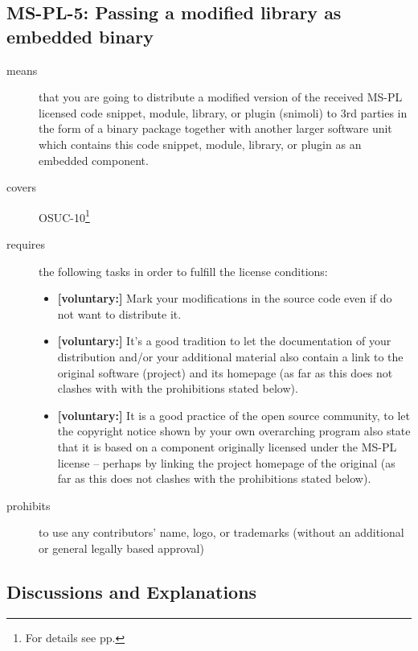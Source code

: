 \subsection{MS-PL-5: Passing a modified library as embedded binary}
\label{OSUC-10-MS-PL}
\begin{description}
\item[means] that you are going to distribute a modified version of the received
MS-PL licensed code snippet, module, library, or plugin (snimoli) to 3rd parties
in the form of a binary package together with another larger software unit which
contains this code snippet, module, library, or plugin as an embedded component.

\item[covers] OSUC-10\footnote{For details see pp. \pageref{OSUC-10-DEF}}
\item[requires] the following tasks in order to fulfill the license conditions:
\begin{itemize}
 
  \item \textbf{[voluntary:]} Mark your modifications in the source code even if
  do not want to distribute it.
  
  \item \textbf{[voluntary:]} It's a good tradition to let the documentation of
  your distribution and/or your additional material also contain a link to the
  original software (project) and its homepage (as far as this does not clashes
  with with the prohibitions stated below).
  
  \item \textbf{[voluntary:]} It is a good practice of the open source
  community, to let the copyright notice shown by your own overarching program
  also state that it is based on a component originally licensed under the MS-PL
  license -- perhaps by linking the project homepage of the original (as far as
  this does not clashes with the prohibitions stated below).
  
\end{itemize}

\item[prohibits] to use any contributors' name, logo, or trademarks (without an
additional or general legally based approval)

\end{description}

\subsection{Discussions and Explanations}

